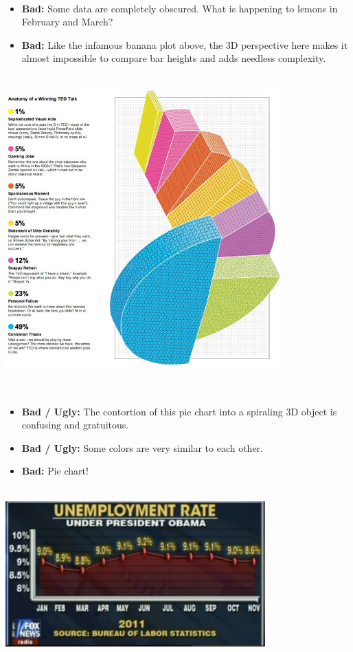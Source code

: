 \documentclass[
]{book}
\providecommand{\tightlist}{%
  \setlength{\itemsep}{0pt}\setlength{\parskip}{0pt}}
\begin{document}
~

\begin{itemize}
\tightlist
\item
  \textbf{Bad:} Some data are completely obscured. What is happening to lemons in February and March?\\
\item
  \textbf{Bad:} Like the infamous banana plot above, the 3D perspective here makes it almost impossible to compare bar heights and adds needless complexity.
\end{itemize}

~\\

\includegraphics[width=0.8\textwidth,height=\textheight]{img/vis15.jpg}

~

\begin{itemize}
\tightlist
\item
  \textbf{Bad / Ugly:} The contortion of this pie chart into a spiraling 3D object is confusing and gratuitous.
\item
  \textbf{Bad / Ugly:} Some colors are very similar to each other.\\
\item
  \textbf{Bad:} Pie chart!
\end{itemize}

~\\

\includegraphics[width=0.75\textwidth,height=\textheight]{img/vis16.png}
\end{document}
